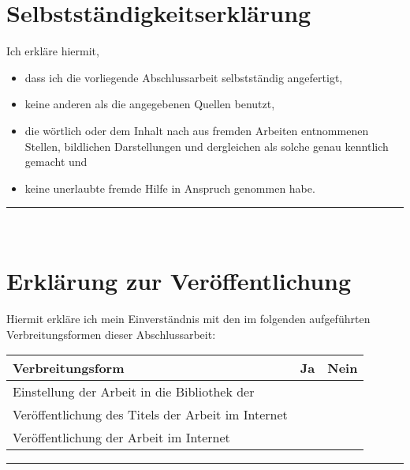 %
%
%
%

\section*{Selbstständigkeitserklärung}

Ich erkläre hiermit,
\begin{itemize}
	\item dass ich die vorliegende Abschlussarbeit selbstständig angefertigt,
	\item keine anderen als die angegebenen Quellen benutzt,
	\item die wörtlich oder dem Inhalt nach aus fremden Arbeiten entnommenen Stellen, bildlichen Darstellungen und dergleichen als solche genau kenntlich gemacht und
	\item keine unerlaubte fremde Hilfe in Anspruch genommen habe.
\end{itemize}

\vspace{3cm}
\makebox[.45\linewidth][l]{\thecity, \thedate}\hfill\rule{.45\linewidth}{0.5pt}\\
\makebox[.45\linewidth][l]{}\hfill\makebox[.45\linewidth][l]{\theauthor}

\vfill

\section*{Erklärung zur Veröffentlichung}

Hiermit erkläre ich mein Einverständnis mit den im folgenden aufgeführten Verbreitungsformen dieser Abschlussarbeit:

\begin{tabularx}{\linewidth}{|R|c|c|}
	\hline
	\textbf{Verbreitungsform} & \textbf{Ja} & \textbf{Nein}
	\\\hline
	Einstellung der Arbeit in die Bibliothek der \theuniversity &  & 
	\\\hline
	Veröffentlichung des Titels der Arbeit im Internet &  & 
	\\\hline
	Veröffentlichung der Arbeit im Internet &  & 
	\\\hline
\end{tabularx}

\vspace{3cm}
\makebox[.45\linewidth][l]{\thecity, \thedate}\hfill\rule{.45\linewidth}{0.5pt}\\
\makebox[.45\linewidth][l]{}\hfill\makebox[.45\linewidth][l]{\theauthor}
